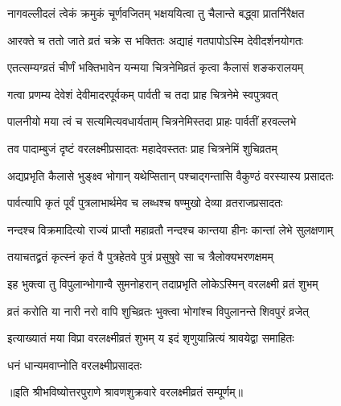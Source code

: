 \twolineshloka
{नागवल्लीदलं त्वेकं क्रमुकं चूर्णवजितम्}
{भक्षययित्वा तु चैलान्ते बद्ध्वा प्रातर्निरैक्षत}%


\twolineshloka
{आरक्ते च ततो जाते व्रतं चक्रे स भक्तितः}
{अद्याहं गतपापोऽस्मि देवीदर्शनयोगतः}%


\twolineshloka
{एतत्सम्यग्व्रतं चीर्णं भक्तिभावेन यन्मया}
{चित्रनेमिव्रतं कृत्वा कैलासं शङकरालयम्}%


\twolineshloka
{गत्वा प्रणम्य देवेशं देवीमादरपूर्वकम्}
{पार्वती च तदा प्राह चित्रनेमे स्वपुत्रवत्}%


\twolineshloka
{पालनीयो मया त्वं च सत्यमित्यवधार्यताम्}
{चित्रनेमिस्तदा प्राहः पार्वतीं हरवल्लभे}%


\twolineshloka
{तव पादाम्बुजं दृष्टं वरलक्ष्मीप्रसादतः}
{महादेवस्ततः प्राह चित्रनेमिं शुचिव्रतम्}%


\twolineshloka
{अद्यप्रभृति कैलासे भुङ्क्ष्व भोगान् यथेप्सितान्}
{पश्चाद्गन्तासि वैकुण्ठं वरस्यास्य प्रसादतः}%


\twolineshloka
{पार्वत्यापि कृतं पूर्वं पुत्रलाभार्थमेव च}
{लब्धश्च षण्मुखो देव्या व्रतराजप्रसादतः}%


\twolineshloka
{नन्दश्च विक्रमादित्यो राज्यं प्राप्तौ महाव्रतौ}
{नन्दश्च कान्तया हीनः कान्तां लेभे सुलक्षणाम्}%


\twolineshloka
{तयाचतद्व्रतं कृत्स्नं कृतं वै पुत्रहेतवे}
{पुत्रं प्रसुषुवे सा च त्रैलोक्यभरणक्षमम्}%


\twolineshloka
{इह भुक्त्वा तु विपुलान्भोगान्वै सुमनोहरान्}
{तदाप्रभृति लोकेऽस्मिन् वरलक्ष्मी व्रतं शुभम्}%


\twolineshloka
{व्रतं करोति या नारी नरो वापि शुचिव्रतः}
{भुक्त्वा भोगांश्च विपुलानन्ते शिवपुरं व्रजेत्}%


\twolineshloka
{इत्याख्यातं मया विप्रा वरलक्ष्मीव्रतं शुभम्}
{य इदं शृणुयान्नित्यं श्रावयेद्वा समाहितः}%

\onelineshloka
{धनं धान्यमवाप्नोति वरलक्ष्मीप्रसादतः}%

॥इति श्रीभविष्योत्तरपुराणे श्रावणशुक्रवारे वरलक्ष्मीव्रतं सम्पूर्णम्॥